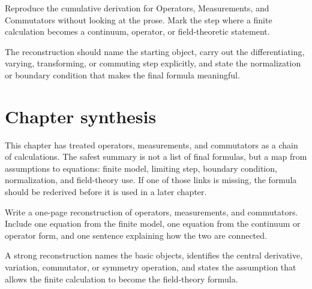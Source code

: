 \begin{exercise}
Reproduce the cumulative derivation for Operators, Measurements, and Commutators without looking at the prose.  Mark the step where a finite calculation becomes a continuum, operator, or field-theoretic statement.
\begin{answer}
The reconstruction should name the starting object, carry out the differentiating, varying, transforming, or commuting step explicitly, and state the normalization or boundary condition that makes the final formula meaningful.
\end{answer}
\end{exercise}



\section{Chapter synthesis}

This chapter has treated operators, measurements, and commutators as a chain of calculations.  The safest summary is not a list of final formulas, but a map from assumptions to equations: finite model, limiting step, boundary condition, normalization, and field-theory use.  If one of those links is missing, the formula should be rederived before it is used in a later chapter.

\begin{exercise}
Write a one-page reconstruction of operators, measurements, and commutators.  Include one equation from the finite model, one equation from the continuum or operator form, and one sentence explaining how the two are connected.
\begin{answer}
A strong reconstruction names the basic objects, identifies the central derivative, variation, commutator, or symmetry operation, and states the assumption that allows the finite calculation to become the field-theory formula.
\end{answer}
\end{exercise}
